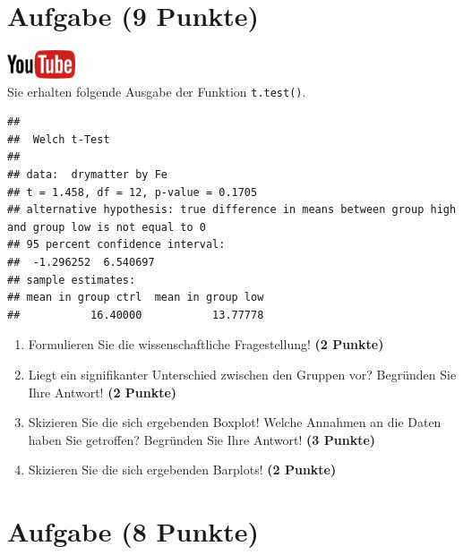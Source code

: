 \documentclass[a4paper, 10pt]{scrartcl}\usepackage[]{graphicx}\usepackage[]{xcolor}
\makeatletter
\newenvironment{kframe}{%
 \def\at@end@of@kframe{}%
 \ifinner\ifhmode%
  \def\at@end@of@kframe{\end{minipage}}%
  \begin{minipage}{\columnwidth}%
 \fi\fi%
 \def\FrameCommand##1{\hskip\@totalleftmargin \hskip-\fboxsep
 \colorbox{shadecolor}{##1}\hskip-\fboxsep
     \hskip-\linewidth \hskip-\@totalleftmargin \hskip\columnwidth}%
 \MakeFramed {\advance\hsize-\width
   \@totalleftmargin\z@ \linewidth\hsize
   \@setminipage}}%
 {\par\unskip\endMakeFramed%
 \at@end@of@kframe}
\newenvironment{knitrout}{}{} %
\makeatother
\begin{document}
\section{Aufgabe \hfill (9 Punkte)}

\hfill\href{https://youtu.be/w62HJlbN28U}{\includegraphics[width =
  2cm]{img/youtube}}\\[1Ex]

Sie erhalten folgende \Rlogo Ausgabe der Funktion \texttt{t.test()}.

\begin{knitrout}
\color{fgcolor}\begin{kframe}
\begin{verbatim}
## 
## 	Welch t-Test
## 
## data:  drymatter by Fe
## t = 1.458, df = 12, p-value = 0.1705
## alternative hypothesis: true difference in means between group high and group low is not equal to 0
## 95 percent confidence interval:
##  -1.296252  6.540697
## sample estimates:
## mean in group ctrl  mean in group low 
##           16.40000           13.77778
\end{verbatim}
\end{kframe}
\end{knitrout}


\begin{enumerate}
  \item Formulieren Sie die wissenschaftliche Fragestellung! \textbf{(2
Punkte)}
\item Liegt ein signifikanter Unterschied zwischen den Gruppen vor?
  Begr{\"u}nden Sie Ihre Antwort! \textbf{(2 Punkte)}
\item Skizieren Sie die sich ergebenden Boxplot!
  Welche Annahmen an die Daten haben Sie getroffen? Begr{\"u}nden Sie Ihre
  Antwort! \textbf{(3 Punkte)} 
\item Skizieren Sie die sich ergebenden Barplots! \textbf{(2 Punkte)} 
\end{enumerate}
 
\clearpage

\section{Aufgabe \hfill (8 Punkte)}
\end{document}
